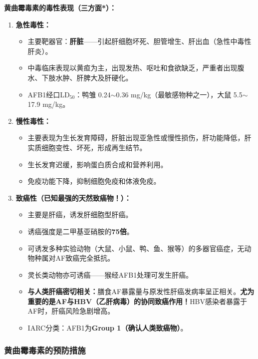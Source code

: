 \begin{keybox}
\textbf{黄曲霉毒素的毒性表现（三方面*）：}
\begin{enumerate}[leftmargin=*]
    \item \textbf{急性毒性：}
    \begin{itemize}[leftmargin=*]
        \item 主要靶器官：\textbf{肝脏}——引起肝细胞坏死、胆管增生、肝出血（急性中毒性肝炎）。
        \item 中毒临床表现以黄疸为主，出现发热、呕吐和食欲缺乏，严重者出现腹水、下肢水肿、肝脾大及肝硬化。
        \item AFB1经口LD$_{50}$：鸭雏 0.24$\sim$0.36 mg/kg（最敏感物种之一），大鼠 5.5$\sim$17.9 mg/kg。
    \end{itemize}
    \item \textbf{慢性毒性：}
    \begin{itemize}[leftmargin=*]
        \item 主要表现为生长发育障碍，肝脏出现亚急性或慢性损伤，肝功能降低，肝实质细胞变性、坏死，形成再生结节。
        \item 生长发育迟缓，影响蛋白质合成和营养利用。
        \item 免疫功能下降，抑制细胞免疫和体液免疫。
    \end{itemize}
    \item \textbf{致癌性（已知最强的天然致癌物！）：}
    \begin{itemize}[leftmargin=*]
        \item 主要是肝癌，诱发肝细胞型肝癌。
        \item 诱癌强度是二甲基亚硝胺的\textbf{75倍}。
        \item 可诱发多种实验动物（大鼠、小鼠、鸭、鱼、猴等）的多器官癌症，无动物种属对AF致癌完全抵抗。
        \item 灵长类动物亦可诱癌——猴经AFB1处理可发生肝癌。
        \item \textbf{与人类肝癌密切相关：}膳食AF暴露量与原发性肝癌发病率呈正相关。\textbf{尤为重要的是AF与HBV（乙肝病毒）的协同致癌作用！}HBV感染者暴露于AF时，肝癌风险急剧增高。
        \item IARC分类：AFB1为\textbf{Group 1（确认人类致癌物）}。
    \end{itemize}
\end{enumerate}
\end{keybox}

\subsubsection{黄曲霉毒素的预防措施}

